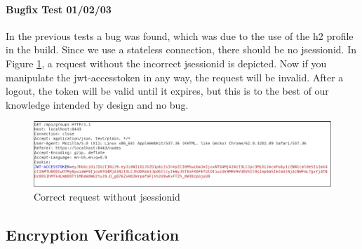 \documentclass{scrreprt}
\begin{document}
\pagebreak
\paragraph{Bugfix Test 01/02/03}
In the previous tests a bug was found, which was due to the use of the h2 profile in the build. Since we use a stateless connection, there should be no jsessionid. In Figure \ref{session04}, a request without the incorrect jsessionid is depicted. Now if you manipulate the jwt-accesstoken in any way, the request will be invalid. After a logout, the token will be valid until it expires, but this is to the best of our knowledge intended by design and no bug.
\begin{figure}[h!]
	\centering
	\includegraphics[width=14cm]{report/session04.png}
	\caption{Correct request without jsessionid}
	\label{session04}
\end{figure}


\pagebreak 

\subsection{Encryption Verification}
\end{document}
